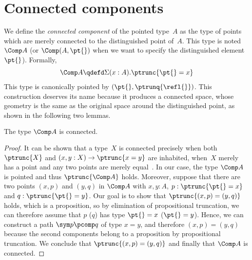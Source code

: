 \section{Connected components}
\label{connected-component}
We define the \emph{connected component} of the pointed type~$A$ as the type of
points which are merely connected to the distinguished point of~$A$. This type
is noted~$\Comp A$ (or $\Comp(A,\pt{})$ when we want to specify the
distinguished element~$\pt{}$). Formally,
\[
  \Comp A
  \qdefd
  \Sigma(x:A).\ptrunc{\pt{}=x}
\]
This type is canonically pointed by $(\pt{},\ptrunq{\refl{}})$.
%
This construction deserves its name because it produces a connected space, whose
geometry is the same as the original space around the distinguished point, as
shown in the following two lemmas.

\begin{lemma}
  The type $\Comp A$ is connected.
\end{lemma}
\begin{proof}
  It can be shown that a type~$X$ is connected precisely when both $\ptrunc{X}$
  and $(x,y:X)\to\ptrunc{x=y}$ are inhabited, \ie when~$X$ merely has a point
  and any two points are merely equal~\cite[Exercise~7.6]{hottbook}.
  In our case, the type $\Comp A$ is pointed and thus $\ptrunc{\Comp A}$
  holds.
  Moreover, suppose that there are two points $(x,p)$ and $(y,q)$ in $\Comp A$
  with $x,y:A$, $p:\ptrunc{\pt{}=x}$ and $q:\ptrunc{\pt{}=y}$. Our goal is to
  show that $\ptrunc{(x,p)=(y,q)}$ holds, which is a proposition, so by
  elimination of propositional truncation, we can therefore assume that $p$
  (\resp $q$) has type $\pt{}=x$ (\resp $\pt{}=y$). Hence, we can construct a path
  $\sym p\pcomp q$ of type $x=y$, and therefore $(x,p)=(y,q)$ because the second
  components belong to a proposition by propositional truncation. We conclude
  that $\ptrunc{(x,p)=(y,q)}$ and finally that $\Comp A$ is connected.
\end{proof}

